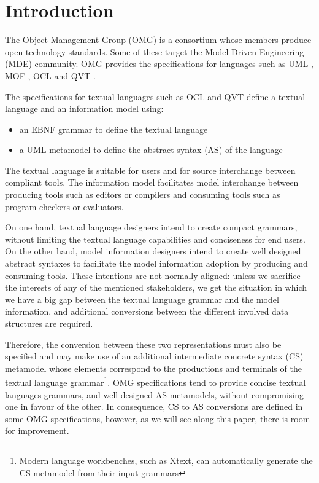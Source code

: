 \documentclass{llncs}
\begin{document}
\section{Introduction}

The Object Management Group (OMG) is a consortium whose members produce open technology standards. Some of these target the Model-Driven Engineering (MDE) community. OMG provides the specifications for languages such as UML \cite{omg2012uml}, MOF \cite{omg2013mof}, OCL \cite{omg2013ocl} and QVT \cite{omg2014qvt}.

The specifications for textual languages such as OCL and QVT define a textual language and an information model using:
\begin{itemize}
\item an EBNF grammar to define the textual language
\item a UML metamodel to define the abstract syntax (AS) of the language
\end{itemize}
The textual language is suitable for users and for source interchange between compliant tools. The information model facilitates model interchange between producing tools such as editors or compilers and consuming tools such as program checkers or  evaluators. 

On one hand, textual language designers intend to create compact grammars, without limiting the textual language capabilities and conciseness for end users. On the other hand, model information designers intend to create well designed abstract syntaxes to facilitate the model information adoption by producing and consuming tools. These intentions are not normally aligned: unless we sacrifice the interests of any of the mentioned stakeholders, we get the situation in which we have a big gap between the textual language grammar and the model information, and additional conversions between the different involved data structures are required.

Therefore, the conversion between these two representations must also be specified and may make use of an additional intermediate concrete syntax (CS) metamodel whose elements correspond to the productions and terminals of the textual language grammar\footnote{Modern language workbenches, such as Xtext, can automatically generate the CS metamodel from their input grammars}. OMG specifications tend to provide concise textual languages grammars, and well designed AS metamodels, without compromising one in favour of the other. In consequence, CS to AS conversions are defined in some OMG specifications, however, as we will see along this paper, there is room for improvement.
\end{document}
